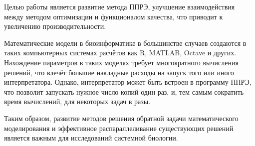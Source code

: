 Целью работы является развитие метода ППРЭ,
улучшение взаимодействия между
методом оптимизации и функционалом качества,
что приводит к увеличению производительности.

Математические модели в биоинформатике
в большинстве случаев создаются
в таких компьютерных системах расчётов
как R, MATLAB, Octave и других.
Нахождение параметров в таких моделях
требует многократного вычисления решений,
что влечёт большие накладные расходы на запуск
того или иного интерпретатора.
Однако, интерпретатор может быть встроен в программу ППРЭ,
что позволит запускать нужное число копий один раз,
и, тем самым сократить время вычислений, для некоторых задач в разы.

Таким образом,
развитие методов решения обратной задачи математического моделирования
и эффективное распараллеливание существующих решений
является важным для исследований системной биологии.

